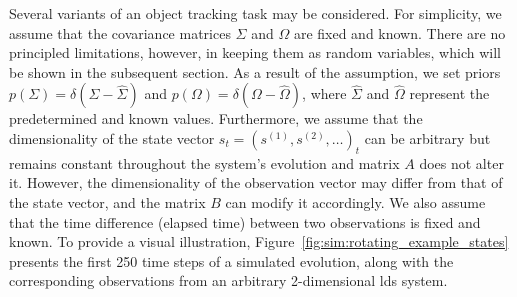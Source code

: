 Several variants of an object tracking task may be considered.
For simplicity, we assume that the covariance matrices $\Sigma$ and $\Omega$ are fixed and
known.
There are no principled limitations, however, in keeping them as random variables, which will
be shown in the subsequent section.
As a result of the assumption, we set priors $p(\Sigma) = \delta(\Sigma - \hat{\Sigma})$ and
$p(\Omega) = \delta(\Omega - \hat{\Omega})$, where $\hat{\Sigma}$ and $\hat{\Omega}$ represent
the predetermined and known values.
Furthermore, we assume that the dimensionality of the state vector $s_t = (s^{(1)},
  s^{(2)},\dots)_t$ can be arbitrary but remains constant throughout the system's evolution and
matrix $A$ does not alter it.
However, the dimensionality of the observation vector may differ from that of the state
vector, and the matrix $B$ can modify it accordingly.
We also assume that the time difference (elapsed time) between two observations is fixed and known.
To provide a visual illustration, Figure~\ref{fig:sim:rotating_example_states} presents the
first 250 time steps of a simulated evolution, along with the corresponding observations from
an arbitrary 2-dimensional \ac{lds} system.

